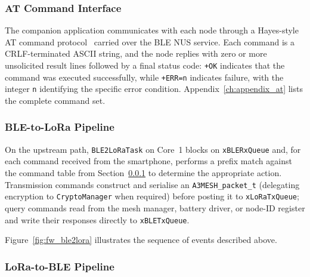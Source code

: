 \documentclass[english,bachelor]{tfgitic}[2026/01/22]
\begin{document}
\subsubsection{AT Command Interface}
\label{sec:fw_at}

The companion application communicates with each node through a Hayes-style AT command
protocol~\cite{itu1999v250} carried over the BLE NUS service. Each command is a
CRLF-terminated ASCII string, and the node replies with zero or more unsolicited result
lines followed by a final status code: \texttt{+OK} indicates that the command was
executed successfully, while \texttt{+ERR=n} indicates failure, with the integer
\texttt{n} identifying the specific error condition. Appendix~\ref{ch:appendix_at} lists the complete command set.


\subsubsection{BLE-to-LoRa Pipeline}
\label{sec:fw_ble2lora}

On the upstream path, \texttt{BLE2LoRaTask} on Core~1 blocks on \texttt{xBLERxQueue} and,
for each command received from the smartphone, performs a prefix match against the
command table from Section~\ref{sec:fw_at} to determine the appropriate action.
Transmission commands construct and serialise an \texttt{A3MESH\_packet\_t} (delegating
encryption to \texttt{CryptoManager} when required) before posting it to
\texttt{xLoRaTxQueue}; query commands read from the mesh manager, battery driver, or
node-ID register and write their responses directly to \texttt{xBLETxQueue}.

Figure~\ref{fig:fw_ble2lora} illustrates the sequence of events described above.



\subsubsection{LoRa-to-BLE Pipeline}
\label{sec:fw_lora2ble}
\end{document}
